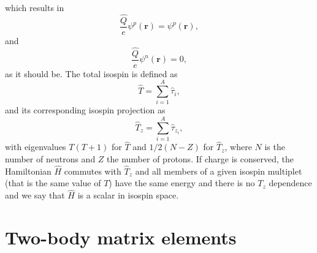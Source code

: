 \documentclass[graybox,sectrefs,envcountresetchap,open=right]{svmonodo}
\begin{document}
which results in 
\[
\frac{\hat{Q}}{e}\psi^p(\mathbf{r})=\psi^p(\mathbf{r}),
\]
and
\[
\frac{\hat{Q}}{e}\psi^n(\mathbf{r})=0,
\]
as it should be. 
The total isospin is defined as
\[
\hat{T}=\sum_{i=1}^A\hat{\tau}_i,
\]
and its corresponding isospin projection as
\[
\hat{T}_z=\sum_{i=1}^A\hat{\tau}_{z_i},
\]
with eigenvalues $T(T+1)$ for $\hat{T}$ and $1/2(N-Z)$ for $\hat{T}_z$, where $N$ is the number of neutrons and $Z$ the number of protons. 
If charge is conserved, the Hamiltonian $\hat{H}$ commutes with $\hat{T}_z$ and all members of a given isospin multiplet
(that is the same value of $T$) have the same energy and there is no $T_z$ dependence and we say that $\hat{H}$ is a scalar in isospin space.

\section{Two-body matrix elements}
\end{document}
